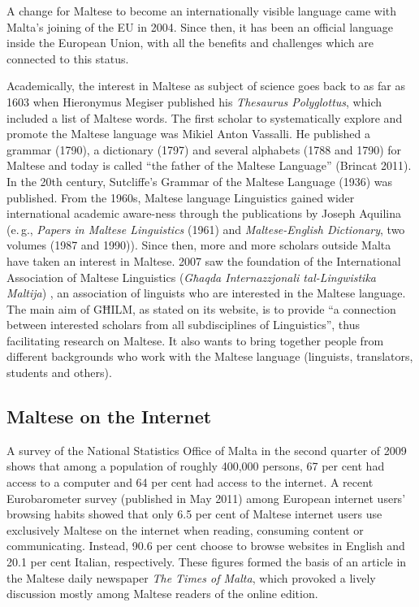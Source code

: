 \documentclass[]{../../metanetpaper}
\begin{document}
\begin{multicols}{2}
A change for Maltese to become an internationally visible language came with Malta's joining of the EU in 2004. Since then, it has been an official language inside the European Union, with all the benefits and challenges which are connected to this status.

Academically, the interest in Maltese as subject of science goes back to as far as 1603 when Hieronymus Megiser published his \emph{Thesaurus Polyglottus}, which included a list of Maltese words. The first scholar to systematically explore and promote the Maltese language was Mikiel Anton Vassalli. He published a grammar (1790), a dictionary (1797) and several alphabets (1788 and 1790) for Maltese and today is called ``the father of the Maltese Language'' (Brincat 2011). In the 20th century, Sutcliffe's Grammar of the Maltese Language (1936) was published. From the 1960s, Maltese language Linguistics gained wider international academic aware-ness through the publications by Joseph Aquilina (e.\,g., \emph{Papers in Maltese Linguistics} (1961) and \emph{Maltese-English Dictionary}, two volumes (1987 and 1990)). Since then, more and more scholars outside Malta have taken an interest in Maltese. 2007 saw the foundation of the International Association of Maltese Linguistics (\emph{Għaqda Internazzjonali tal-Lingwistika Maltija})\cite{GHILM2} , an association of linguists who are interested in the Maltese language. The main aim of GĦILM, as stated on its website, is to provide ``a connection between interested scholars from all subdisciplines of Linguistics'', thus facilitating research on Maltese. It also wants to bring together people from different backgrounds who work with the Maltese language (linguists, translators, students and others).


\subsection{Maltese on the Internet}

A survey of the National Statistics Office of Malta in the second quarter of 2009\cite{NSO2} shows that among a population of roughly 400,000 persons, 67 per cent had access to a computer and 64 per cent had access to the internet. A recent Eurobarometer survey (published in May 2011)\cite{Eurobarometer1} among European internet users' browsing habits showed that only 6.5 per cent of Maltese internet users use exclusively Maltese on the internet when reading, consuming content or communicating. Instead, 90.6 per cent choose to browse websites in English and 20.1 per cent Italian, respectively. These figures formed the basis of an article in the Maltese daily newspaper \emph{The Times of Malta}, which provoked a lively discussion mostly among Maltese readers of the online edition\cite{TimesOfMalta1}. 


\end{multicols}
\end{document}
